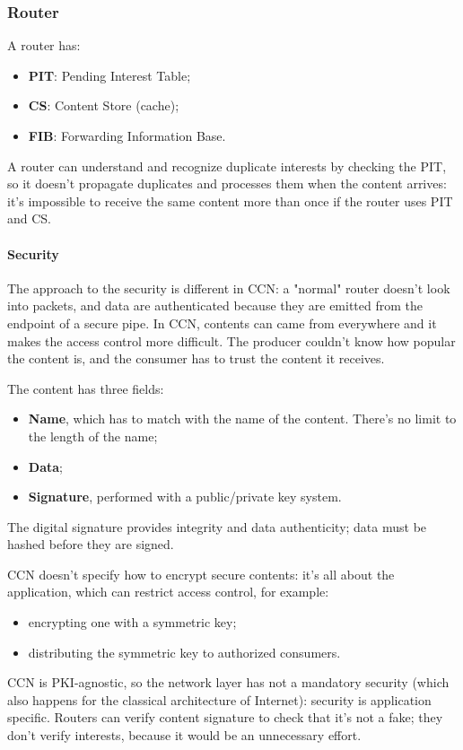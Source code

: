 \subsubsection{Router}
A router has:
\begin{itemize}
  \item \textbf{PIT}: Pending Interest Table;
  \item \textbf{CS}: Content Store (cache);
  \item \textbf{FIB}: Forwarding Information Base.
\end{itemize}

A router can understand and recognize duplicate interests by checking the PIT,
so it doesn't propagate duplicates and processes them when the content arrives:
it's impossible to receive the same content more than once if the router uses
PIT and CS.

\paragraph*{Security}
The approach to the security is different in CCN: a "normal" router doesn't
look into packets, and data are authenticated because they are emitted from
the endpoint of a secure pipe. In CCN, contents can came from everywhere and it
makes the access control more difficult. The producer couldn't know how popular
the content is, and the consumer has to trust the content it receives.

The content has three fields:
\begin{itemize}
  \item \textbf{Name}, which has to match with the name of the content. There's
no limit to the length of the name;
  \item \textbf{Data};
  \item \textbf{Signature}, performed with a public/private key system.
\end{itemize}
The digital signature provides integrity and data authenticity; data must be
hashed before they are signed.

CCN doesn't specify how to encrypt secure contents: it's all about the
application, which can restrict access control, for example:
\begin{itemize}
  \item encrypting one with a symmetric key;
  \item distributing the symmetric key to authorized consumers.
\end{itemize}
CCN is PKI-agnostic, so the network layer has not a mandatory security (which
also happens for the classical architecture of Internet): security is
application specific. Routers can verify content signature to check that
it's not a fake; they don't verify interests, because it would be an
unnecessary effort.

